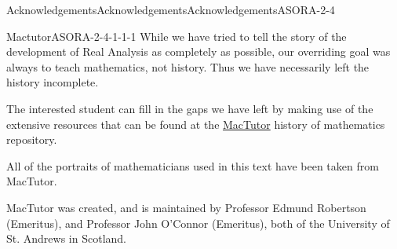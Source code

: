 \documentclass[oneside,10pt,]{book}
\numberwithin{equation}{part}
\begin{document}
%
\begin{acknowledgement}{Acknowledgements}{Acknowledgements}{}{Acknowledgements}{}{}{ASORA-2-4}
%
\begin{descriptionlist}
\begin{dlimedium}{Mactutor}{ASORA-2-4-1-1-1}%
While we have tried to tell the story of the development of Real Analysis as completely as possible, our overriding goal was always to teach mathematics, not history. Thus we have necessarily left the history incomplete.%
\par
The interested student can fill in the gaps we have left by making use of the extensive resources that can be found at the \href{https://mathshistory.st-andrews.ac.uk/}{MacTutor}\footnotemark{} history of mathematics repository.%
\par
All of the portraits of mathematicians used in this text have been taken from MacTutor.%
\par
MacTutor was created, and is maintained by Professor Edmund Robertson (Emeritus), and Professor John O'Connor (Emeritus), both of the University of St. Andrews in Scotland.%
\end{dlimedium}%
%
\end{descriptionlist}
%
\end{acknowledgement}
%
%
\typeout{************************************************}
\typeout{************************************************}
%
\end{document}
